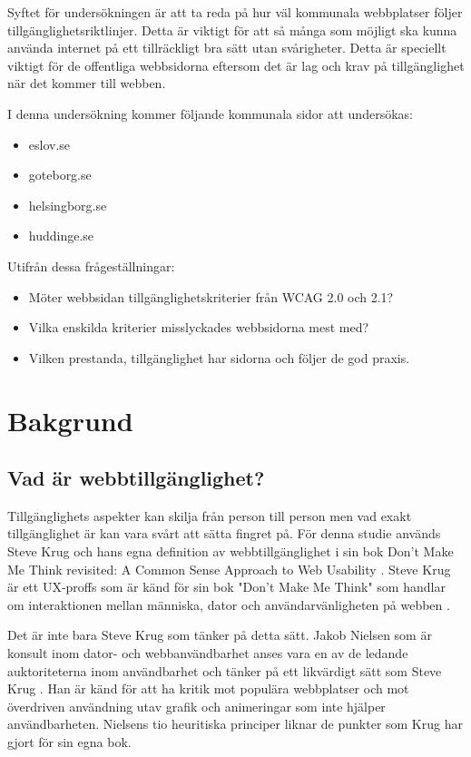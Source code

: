 \documentclass[11p]{article}
\begin{document}
    Syftet för undersökningen är att ta reda på hur väl kommunala webbplatser följer tillgänglighetsriktlinjer.
    Detta är viktigt för att så många som möjligt ska kunna använda internet på ett tillräckligt bra sätt utan svårigheter.
    Detta är speciellt viktigt för de offentliga webbsidorna eftersom det är lag och krav på tillgänglighet när det kommer till webben.

    I denna undersökning kommer följande kommunala sidor att undersökas:

    \begin{itemize}
        \item eslov.se
        \item goteborg.se
        \item helsingborg.se
        \item huddinge.se
    \end{itemize}

    Utifrån dessa frågeställningar:

    \begin{itemize}
        \item Möter webbsidan tillgänglighetskriterier från WCAG 2.0 och 2.1?
        \item Vilka enskilda kriterier misslyckades webbsidorna mest med?
        \item Vilken prestanda, tillgänglighet har sidorna och följer de god praxis.
    \end{itemize}
    
    \section{Bakgrund}
    
    \subsection{Vad är webbtillgänglighet?}
    Tillgänglighets aspekter kan skilja från person till person men vad exakt tillgänglighet är kan vara svårt att sätta fingret på.
    För denna studie används Steve Krug och hans egna definition av webbtillgänglighet i sin bok Don't Make Me Think revisited: A Common Sense Approach to Web Usability \textcite{Krug}.
    Steve Krug är ett UX-proffs som är känd för sin bok "Don't Make Me Think" som handlar om interaktionen mellan människa, dator och användarvänligheten på webben \textcite{Krug_Wikipedia}.

    Det är inte bara Steve Krug som tänker på detta sätt.
    Jakob Nielsen som är konsult inom dator- och webbanvändbarhet anses vara en av de ledande auktoriteterna inom användbarhet och tänker på ett likvärdigt sätt som Steve Krug \textcite{Jakob_Nielsen}.
    Han är känd för att ha kritik mot populära webbplatser och mot överdriven användning utav grafik och animeringar som inte hjälper användbarheten.
    Nielsens tio heuritiska principer liknar de punkter som Krug har gjort för sin egna bok.
\end{document}
